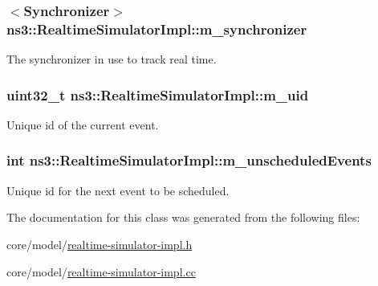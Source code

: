 \subsubsection[{\texorpdfstring{m\+\_\+synchronizer}{m_synchronizer}}]{$<${\bf Synchronizer}$>$ ns3\+::\+Realtime\+Simulator\+Impl\+::m\+\_\+synchronizer\hspace{0.3cm}{\ttfamily [private]}}\hypertarget{classns3_1_1RealtimeSimulatorImpl_a87a72268b521afcae7ea4c891c398d27}{}\label{classns3_1_1RealtimeSimulatorImpl_a87a72268b521afcae7ea4c891c398d27}
The synchronizer in use to track real time. 
\subsubsection[{\texorpdfstring{m\+\_\+uid}{m_uid}}]{\setlength{\rightskip}{0pt plus 5cm}uint32\+\_\+t ns3\+::\+Realtime\+Simulator\+Impl\+::m\+\_\+uid\hspace{0.3cm}{\ttfamily [private]}}\hypertarget{classns3_1_1RealtimeSimulatorImpl_a733827168b695086e183a53f5a0dacf2}{}\label{classns3_1_1RealtimeSimulatorImpl_a733827168b695086e183a53f5a0dacf2}
Unique id of the current event. 
\subsubsection[{\texorpdfstring{m\+\_\+unscheduled\+Events}{m_unscheduledEvents}}]{\setlength{\rightskip}{0pt plus 5cm}int ns3\+::\+Realtime\+Simulator\+Impl\+::m\+\_\+unscheduled\+Events\hspace{0.3cm}{\ttfamily [private]}}\hypertarget{classns3_1_1RealtimeSimulatorImpl_a1ef7b74c3be3d3febb1f07f8db44fb76}{}\label{classns3_1_1RealtimeSimulatorImpl_a1ef7b74c3be3d3febb1f07f8db44fb76}
Unique id for the next event to be scheduled. 

The documentation for this class was generated from the following files\+:\begin{DoxyCompactItemize}
\item 
core/model/\hyperlink{realtime-simulator-impl_8h}{realtime-\/simulator-\/impl.\+h}\item 
core/model/\hyperlink{realtime-simulator-impl_8cc}{realtime-\/simulator-\/impl.\+cc}\end{DoxyCompactItemize}
